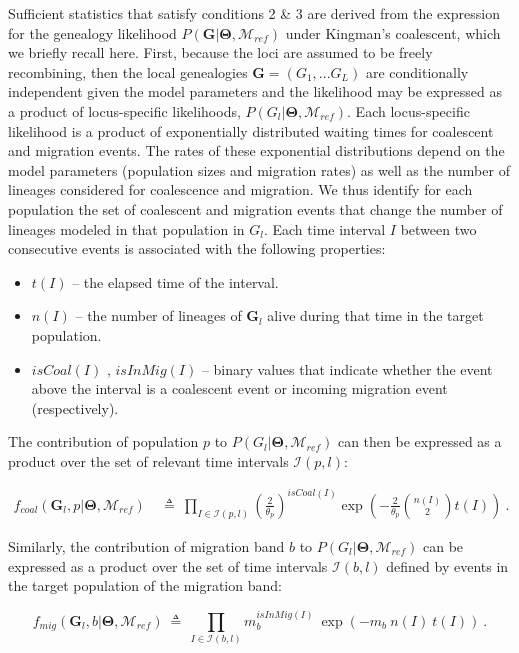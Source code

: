 \documentclass[11pt]{article}
\newcommand{\vect}[1]{\boldsymbol{\mathbf{#1}}}
\newcommand{\M}{\mathcal{M}}
\newcommand{\G}{\vect{G}}
\newcommand{\T}{\vect{\Theta}}
\newcommand{\Ip}{\mathcal{I}(p,l)}
\newcommand{\Ib}{\mathcal{I}(b,l)}
\newcommand{\Mref}{\M_{ref}}
\newcommand{\1}{\mathbbm{1}}
\begin{document}
Sufficient statistics that satisfy conditions 2 \& 3 are derived from the expression for the genealogy likelihood $P(\G|\T, \Mref)$ under Kingman's coalescent, which we briefly recall here.
First, because the loci are assumed to be freely recombining, then the local genealogies $\G=(G_1,...G_L)$ are conditionally independent given the model parameters and the likelihood may be expressed as a product of locus-specific likelihoods, $P(G_l|\T,\Mref)$.  Each locus-specific likelihood is a product of exponentially distributed waiting times for coalescent and migration events. The rates of these exponential distributions depend on the model parameters (population sizes and migration rates) as well as the number of lineages considered for coalescence and migration. We thus identify for each population the set of coalescent and migration events that change the number of lineages modeled in that population in $G_l$. Each time interval $I$ between two consecutive events is associated with the following properties:
\begin{itemize}
 \item $t(I)$ -- the elapsed time of the interval.
 \item $n(I)$ -- the number of lineages of $\G_l$ alive during that time in the target population.
 \item $isCoal(I)$ , $isInMig(I)$  -- binary values that indicate whether the event above the interval is a coalescent event or incoming migration event (respectively).
\end{itemize}
%
%
The contribution of population $p$ to $P(G_l|\T,\Mref)$ can then be expressed as a product over the set of relevant time intervals $\Ip$:
%
%
\begin{small}
\begin{align}
f_{coal}(\G_l,p|\T,\Mref) 
& ~\triangleq~ \prod_{I \in \Ip} \left(\frac{2}{\theta_p}\right)^{isCoal(I)} \exp\left(-\frac{2}{\theta_p}{n(I) \choose 2}t(I)\right) ~. %
\label{eqn:ld-coal}
\end{align}
\end{small}
%
%
Similarly, the contribution of migration band $b$ to $P(G_l|\T,\Mref)$ can be expressed as a product over the set of time intervals $\Ib$ defined by events in the target population of the migration band:
%
%
\begin{small}
\begin{equation}
f_{mig}(\G_l,b|\T,\Mref) ~\triangleq~ \prod_{I \in \Ib} m_{b}^{isInMig(I)} ~ \exp \left( - m_b~ n(I)~t(I)\right) ~.
\label{eqn:ld-mig}
\end{equation}
\end{small}
%
%
\end{document}
